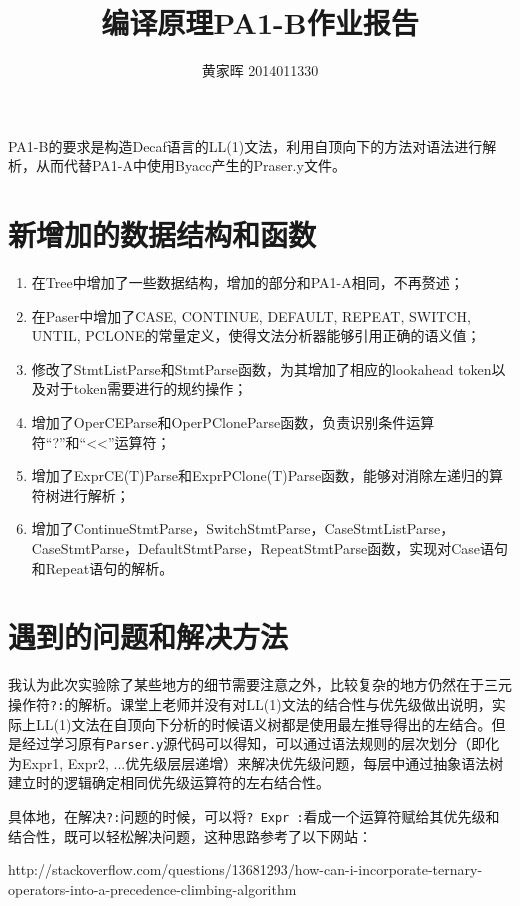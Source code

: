 \documentclass[12pt,a4paper]{article}
\title{编译原理PA1-B作业报告}
\author{黄家晖 2014011330}
\date{}
\begin{document}
\maketitle

PA1-B的要求是构造Decaf语言的LL(1)文法，利用自顶向下的方法对语法进行解析，从而代替PA1-A中使用Byacc产生的Praser.y文件。

\section{新增加的数据结构和函数}
\begin{enumerate}
\item 在Tree中增加了一些数据结构，增加的部分和PA1-A相同，不再赘述；
\item 在Paser中增加了CASE, CONTINUE, DEFAULT, REPEAT, SWITCH, UNTIL, PCLONE的常量定义，使得文法分析器能够引用正确的语义值；
\item 修改了StmtListParse和StmtParse函数，为其增加了相应的lookahead token以及对于token需要进行的规约操作；
\item 增加了OperCEParse和OperPCloneParse函数，负责识别条件运算符``?''和``<<''运算符；
\item 增加了ExprCE(T)Parse和ExprPClone(T)Parse函数，能够对消除左递归的算符树进行解析；
\item 增加了ContinueStmtParse，SwitchStmtParse，CaseStmtListParse，CaseStmtParse，DefaultStmtParse，RepeatStmtParse函数，实现对Case语句和Repeat语句的解析。
\end{enumerate}

\section{遇到的问题和解决方法}

我认为此次实验除了某些地方的细节需要注意之外，比较复杂的地方仍然在于三元操作符\texttt{?:}的解析。课堂上老师并没有对LL(1)文法的结合性与优先级做出说明，实际上LL(1)文法在自顶向下分析的时候语义树都是使用最左推导得出的左结合。但是经过学习原有\texttt{Parser.y}源代码可以得知，可以通过语法规则的层次划分（即化为Expr1, Expr2, ...优先级层层递增）来解决优先级问题，每层中通过抽象语法树建立时的逻辑确定相同优先级运算符的左右结合性。

具体地，在解决\texttt{?:}问题的时候，可以将\texttt{? Expr :}看成一个运算符赋给其优先级和结合性，既可以轻松解决问题，这种思路参考了以下网站：

http://stackoverflow.com/questions/13681293/how-can-i-incorporate-ternary-operators-into-a-precedence-climbing-algorithm
\end{document}
